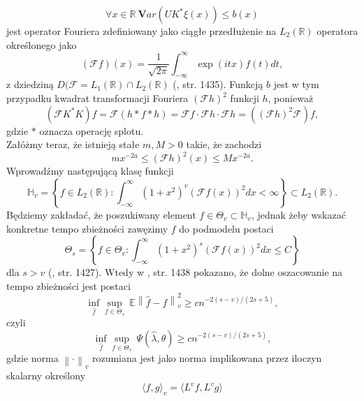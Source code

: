 \documentclass[man,mfiu]{mgrwms}
\newcommand{\norm}[1]{\left\lVert#1\right\rVert}
\begin{document}
\begin{equation}\label{3}
\forall x\in \mathbb{R}\ \pmb{V}ar(UK^*\xi (x))\leq b(x)
\end{equation}
jest operator Fouriera  zdefiniowany jako ciągłe przedłużenie na $L_2(\mathbb{R})$ operatora określonego jako
\begin{displaymath}
(\mathcal{F}f)(x)=\frac{1}{\sqrt{2\pi}}\int_{-\infty}^{\infty}\exp (itx)f(t)dt,
\end{displaymath}
z dziedziną $D(\mathcal{F}= L_1(\mathbb{R})\cap L_2(\mathbb{R})$ (\cite{mair}, str. 1435). Funkcją $b$ jest w tym przypadku kwadrat transformacji Fouriera $(\mathcal{F}h)^2$ funkcji $h$, ponieważ 
\begin{displaymath}
\left(\mathcal{F}K^*K\right)f =\mathcal{F}(h\ast f\ast h)=\mathcal{F}f\cdot \mathcal{F}h\cdot \mathcal{F}h =\left(\left(\mathcal{F}h\right)^2\mathcal{F}\right)f,
\end{displaymath}
gdzie $\ast$ oznacza operację splotu.\\
Załóżmy teraz, że istnieją stałe $m,M>0$ takie, że zachodzi 
\begin{displaymath}
mx^{-2a}\leq (\mathcal{F}h)^2(x)\leq Mx^{-2a}.
\end{displaymath}
Wprowadźmy następującą klasę funkcji
\begin{displaymath}
\mathbb{H}_v=\left\{f\in L_2(\mathbb{R})\colon \int_{-\infty}^{\infty}(1+x^2)^v(\mathcal{F}f(x))^2dx<\infty\right\}\subset L_2(\mathbb{R}).
\end{displaymath}
Będziemy zakładać, że poszukiwany element $f\in \Theta_v\subset \mathbb{H}_v$, jednak żeby wskazać konkretne tempo zbieżności zawęzimy $f$ do podmodelu postaci
\begin{displaymath}
\Theta_s=\left\{f\in\Theta_v\colon \int_{-\infty}^{\infty}(1+x^2)^s(\mathcal{F}f(x))^2dx \leq C\right\}
\end{displaymath}
dla $s>v$ (\cite{mair}, str. 1427). Wtedy w \cite{mair}, str. 1438 pokazano, że dolne oszacowanie na tempo zbieżności jest postaci
\begin{displaymath}
\inf_{\hat{f}}\sup_{f\in\Theta_s}\ \mathbb{E}\norm{\hat{f}-f}_v^2\geq cn^{-2(s-v)/(2s+5)},
\end{displaymath}
czyli
\begin{displaymath}
\inf_{\hat{f}}\sup_{f\in\Theta_s}\ \Psi(\hat{\lambda},\theta)\geq cn^{-2(s-v)/(2s+5)},
\end{displaymath}
gdzie norma $\norm{\cdot}_v$ rozumiana jest jako norma implikowana przez iloczyn skalarny określony 
\begin{displaymath}
\langle f,g\rangle_v=\langle L^vf,L^vg\rangle
\end{displaymath}
\end{document}

